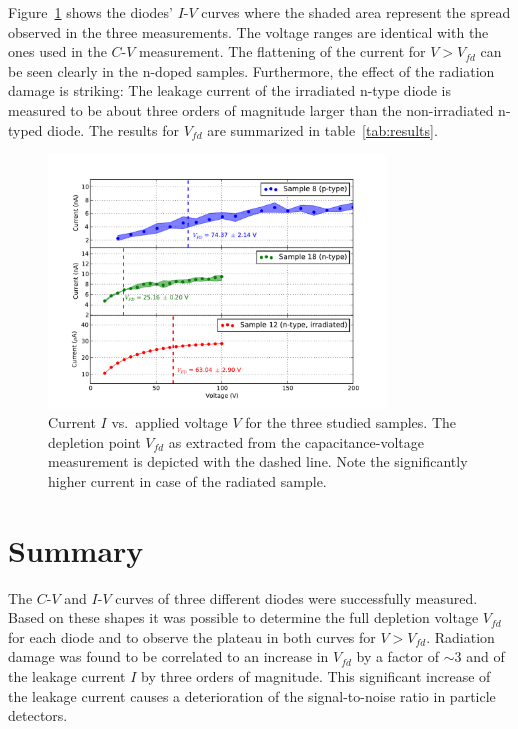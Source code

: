 \documentclass[11pt,a4paper]{report}
\begin{document}
Figure~\ref{fig:iv} shows the diodes' $I$-$V$ curves where the shaded area represent the spread observed in the three measurements.
The voltage ranges are identical with the ones used in the $C$-$V$ measurement.
The flattening of the current for $V>V_{fd}$ can be seen clearly in the n-doped samples.
Furthermore, the effect of the radiation damage is striking: The leakage current of the irradiated n-type diode is measured to be about three orders of magnitude larger than the non-irradiated n-typed diode. The results for $V_{fd}$ are summarized in table~\ref{tab:results}.

\begin{figure}
  \centering
  \includegraphics[width=0.8\textwidth]{./figures/iv.pdf}
  \caption{Current $I$ vs.\ applied voltage $V$ for the three studied samples. The depletion point $V_{fd}$ as extracted from the capacitance-voltage measurement is depicted with the dashed line. Note the significantly higher current in case of the radiated sample.}\label{fig:iv}
\end{figure}



\section*{Summary}
\label{sec:summary}

The $C$-$V$ and $I$-$V$ curves of three different diodes were successfully measured.
Based on these shapes it was possible to determine the full depletion voltage $V_{fd}$ for each diode and to observe the plateau in both curves for $V>V_{fd}$.
Radiation damage was found to be correlated to an increase in $V_{fd}$ by a factor of $\sim 3$ and of the leakage current $I$ by three orders of magnitude.
This significant increase of the leakage current causes a deterioration of the signal-to-noise ratio in particle detectors.

\printbibliography
\end{document}
